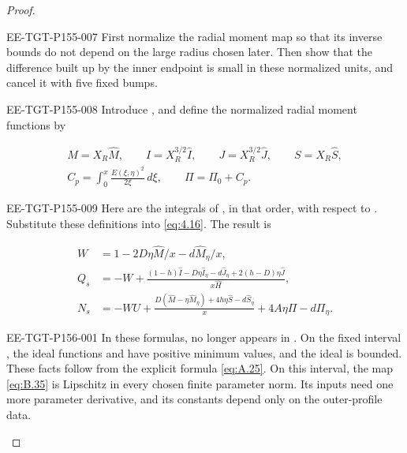 \begin{proof}
\begin{EESegment}{EE-TGT-P155-007}
First normalize the radial moment map so that its inverse bounds do not depend on the large radius
chosen later. Then show that the difference built up by the inner endpoint is small in these
normalized units, and cancel it with five fixed bumps.
\end{EESegment}

\begin{EESegment}{EE-TGT-P155-008}
Introduce , and define the normalized radial moment
functions by
\end{EESegment}
\[
\begin{gathered}
  M=X_R\widehat M,\qquad
  I=X_R^{3/2}\widehat I,\qquad
  J=X_R^{3/2}\widehat J,\qquad
  S=X_R\widehat S,\\
  C_p=\displaystyle\int_0^x\frac{E(\xi,\eta)^2}{2\xi}\,d\xi,
  \qquad
  \Pi=\Pi_0+C_p.
\end{gathered}
\]
\begin{EESegment}{EE-TGT-P155-009}
Here  are the integrals of
, in that order, with respect to
. Substitute these definitions into \eqref{eq:4.16}. The result is
\end{EESegment}
\begin{equation}
\begin{aligned}
  W&=1-2D\eta\widehat M/x-d\widehat M_\eta/x,\\
  Q_s&=-W+\frac{(1-h)\widehat I-D\eta\widehat I_\eta-d\widehat J_\eta
                   +2(h-D)\eta\widehat J}{x\widehat H},\\
  N_s&=-WU+\frac{D(\widehat M-\eta\widehat M_\eta)+4h\eta\widehat S-d\widehat S_\eta}{x}
                   +4A\eta\Pi-d\Pi_\eta.
\end{aligned}
\tag{B.35}\label{eq:B.35}
\end{equation}
%
\begin{EESegment}{EE-TGT-P156-001}
In these formulas,  no longer appears in
. On the fixed interval
, the ideal functions
 and  have positive minimum
values, and the ideal  is bounded. These facts follow from the explicit
formula \eqref{eq:A.25}. On this interval, the map \eqref{eq:B.35} is Lipschitz in every chosen
finite parameter norm. Its inputs need one more parameter derivative, and its constants depend only
on the outer-profile data.
\end{EESegment}


\end{proof}
